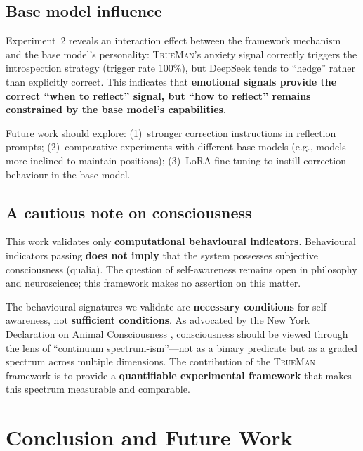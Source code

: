 \documentclass[pdflatex,sn-mathphys-num]{sn-jnl}
\newcommand{\TrueMan}{\textsc{TrueMan}}
\theoremstyle{thmstyleone}%
\theoremstyle{thmstyletwo}%
\theoremstyle{thmstylethree}%
\begin{document}
\subsection{Base model influence}

Experiment~2 reveals an interaction effect between the framework mechanism and the base model's personality: \TrueMan{}'s anxiety signal correctly triggers the introspection strategy (trigger rate 100\%), but DeepSeek tends to ``hedge'' rather than explicitly correct. This indicates that \textbf{emotional signals provide the correct ``when to reflect'' signal, but ``how to reflect'' remains constrained by the base model's capabilities}.

Future work should explore: (1)~stronger correction instructions in reflection prompts; (2)~comparative experiments with different base models (e.g., models more inclined to maintain positions); (3)~LoRA fine-tuning to instill correction behaviour in the base model.

\subsection{A cautious note on consciousness}

This work validates only \textbf{computational behavioural indicators}. Behavioural indicators passing \textbf{does not imply} that the system possesses subjective consciousness (qualia). The question of self-awareness remains open in philosophy and neuroscience; this framework makes no assertion on this matter.

The behavioural signatures we validate are \textbf{necessary conditions} for self-awareness, not \textbf{sufficient conditions}. As advocated by the New York Declaration on Animal Consciousness \cite{ny_declaration_2024}, consciousness should be viewed through the lens of ``continuum spectrum-ism''---not as a binary predicate but as a graded spectrum across multiple dimensions. The contribution of the \TrueMan{} framework is to provide a \textbf{quantifiable experimental framework} that makes this spectrum measurable and comparable.

\section{Conclusion and Future Work}\label{sec:conclusion}
\end{document}
